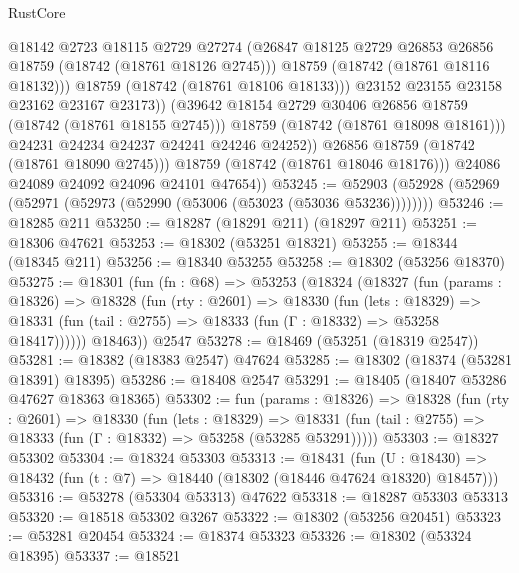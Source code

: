 \begin{lexlean}{RustCore}
\begin{coremodule}
                          @18142
                          @2723
                          @18115
                          @2729
                          @27274
                          (@26847 @18125 @2729 @26853 @26856 @18759 (@18742 (@18761 @18126 @2745)))
                          @18759
                          (@18742 (@18761 @18116 @18132)))
                        @18759
                        (@18742 (@18761 @18106 @18133)))
                      @23152
                      @23155
                      @23158
                      @23162
                      @23167
                      @23173))
                  (@39642 @18154 @2729 @30406 @26856 @18759 (@18742 (@18761 @18155 @2745)))
                  @18759
                  (@18742 (@18761 @18098 @18161)))
                @24231
                @24234
                @24237
                @24241
                @24246
                @24252))
            @26856
            @18759
            (@18742 (@18761 @18090 @2745)))
          @18759
          (@18742 (@18761 @18046 @18176)))
        @24086
        @24089
        @24092
        @24096
        @24101
        @47654))
@53245 := @52903 (@52928 (@52969 (@52971 (@52973 (@52990 (@53006 (@53023 (@53036 @53236))))))))
@53246 := @18285 @211
@53250 := @18287 (@18291 @211) (@18297 @211)
@53251 := @18306 @47621
@53253 := @18302 (@53251 @18321)
@53255 := @18344 (@18345 @211)
@53256 := @18340 @53255
@53258 := @18302 (@53256 @18370)
@53275 := @18301
    (fun (fn : @68) =>
    @53253
      (@18324
        (@18327
          (fun (params : @18326) =>
          @18328
            (fun (rty : @2601) =>
            @18330
              (fun (lets : @18329) =>
              @18331 (fun (tail : @2755) => @18333 (fun (Γ : @18332) => @53258 @18417))))))
        @18463))
    @2547
@53278 := @18469 (@53251 (@18319 @2547))
@53281 := @18382 (@18383 @2547) @47624
@53285 := @18302 (@18374 (@53281 @18391) @18395)
@53286 := @18408 @2547
@53291 := @18405 (@18407 @53286 @47627 @18363 @18365)
@53302 := fun (params : @18326) =>
  @18328
    (fun (rty : @2601) =>
    @18330
      (fun (lets : @18329) =>
      @18331 (fun (tail : @2755) => @18333 (fun (Γ : @18332) => @53258 (@53285 @53291)))))
@53303 := @18327 @53302
@53304 := @18324 @53303
@53313 := @18431
    (fun (U : @18430) => @18432 (fun (t : @7) => @18440 (@18302 (@18446 @47624 @18320) @18457)))
@53316 := @53278 (@53304 @53313) @47622
@53318 := @18287 @53303 @53313
@53320 := @18518 @53302 @3267
@53322 := @18302 (@53256 @20451)
@53323 := @53281 @20454
@53324 := @18374 @53323
@53326 := @18302 (@53324 @18395)
@53337 := @18521

\end{coremodule}
\end{lexlean}
